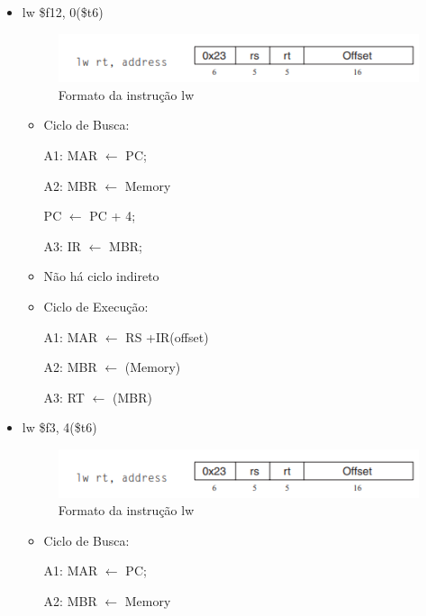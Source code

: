 \documentclass[
	12pt,				%
	oneside,			%
	a4paper,			%
	english,			%
	brazil				%
	]{abntex2ppgsi}
\begin{document}
\begin{itemize}
    \item lw \$f12, 0(\$t6)
        \begin{figure}[h]
            \centering
            \includegraphics{481.png}
            \caption{Formato da instrução lw}
            \label{fig481}
        \end{figure}

        \begin{itemize}
            \item Ciclo de Busca:
    
                A1: MAR $\leftarrow$ PC;
    
                A2: MBR $\leftarrow$ Memory 
    
                PC $\leftarrow$ PC + 4;

                A3: IR $\leftarrow$ MBR;

            \item Não há ciclo indireto
            \item Ciclo de Execução:

                A1: MAR $\leftarrow$ RS +IR(offset)

                A2: MBR $\leftarrow$ (Memory)

                A3: RT $\leftarrow$ (MBR)
        \end{itemize}

    \item lw \$f3, 4(\$t6)
        \begin{figure}[h]
            \centering
            \includegraphics{482.png}
            \caption{Formato da instrução lw}
            \label{fig482}
        \end{figure}

        \begin{itemize}
            \item Ciclo de Busca:
                
                A1: MAR $\leftarrow$ PC;
                
                A2: MBR $\leftarrow$ Memory 
                

\end{itemize}
\end{itemize}
\end{document}
